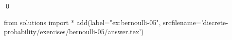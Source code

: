 
\begin{ex} 
  \label{ex:bernoulli-05}
  
  \qed
\end{ex} 
\begin{python0}
from solutions import *
add(label="ex:bernoulli-05",
    srcfilename='discrete-probability/exercises/bernoulli-05/answer.tex') 
\end{python0}
